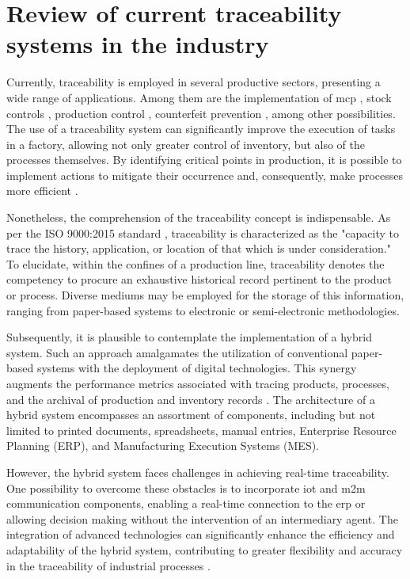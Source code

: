 \section{Review of current traceability systems in the  industry}\label{section: woodFurnitureIndustryTraceabilityReview}

Currently, traceability is employed in several productive sectors, presenting a wide range of applications. Among them are the implementation of \acrfull{mcp} \cite{ZHONG2013}, stock controls \cite{Anssens2011, Yue2011}, production control \cite{Engelhardt2012}, counterfeit prevention \cite{Rida2007}, among other possibilities. The use of a traceability system can significantly improve the execution of tasks in a factory, allowing not only greater control of inventory, but also of the processes themselves. By identifying critical points in production, it is possible to implement actions to mitigate their occurrence and, consequently, make processes more efficient \cite{Chua2012}.


Nonetheless, the comprehension of the traceability concept is indispensable. As per the ISO 9000:2015 standard \cite{iso_9000_2015}, traceability is characterized as the "capacity to trace the history, application, or location of that which is under consideration." To elucidate, within the confines of a production line, traceability denotes the competency to procure an exhaustive historical record pertinent to the product or process. Diverse mediums may be employed for the storage of this information, ranging from paper-based systems to electronic or semi-electronic methodologies.

Subsequently, it is plausible to contemplate the implementation of a hybrid system. Such an approach amalgamates the utilization of conventional paper-based systems with the deployment of digital technologies. This synergy augments the performance metrics associated with tracing products, processes, and the archival of production and inventory records \cite{Qu2012-hw, ZHONG2013, Gilchrist2016}. The architecture of a hybrid system encompasses an assortment of components, including but not limited to printed documents, spreadsheets, manual entries, Enterprise Resource Planning (ERP), and Manufacturing Execution Systems (MES).


However, the hybrid system faces challenges in achieving real-time traceability. One possibility to overcome these obstacles is to incorporate \acrfull{iot} and \acrshort{m2m} communication components, enabling a real-time connection to the \acrshort{erp} or allowing decision making without the intervention of an intermediary agent. The integration of advanced technologies can significantly enhance the efficiency and adaptability of the hybrid system, contributing to greater flexibility and accuracy in the traceability of industrial processes \cite{Gilchrist2016}.

